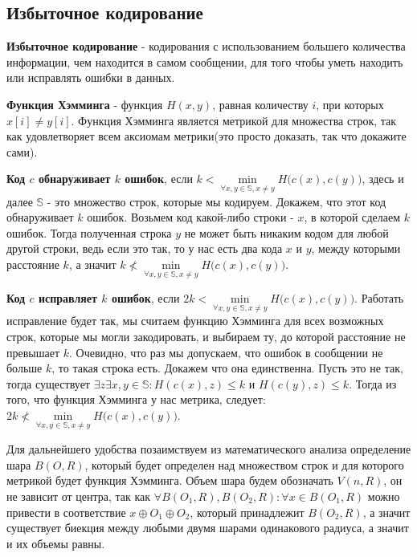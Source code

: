 
\subsection{Избыточное кодирование}
\textbf{Избыточное кодирование} - кодирования с использованием большего количества информации, чем находится в самом сообщении, для того чтобы уметь находить или исправлять ошибки в данных. 

\textbf{Функция Хэмминга} - функция $H(x,y)$, равная количеству $i$, при которых $x[i]\neq y[i]$. Функция Хэмминга является метрикой для множества строк, так как удовлетворяет всем аксиомам метрики(это просто доказать, так что докажите сами). 

\textbf{Код $c$ обнаруживает $k$ ошибок}, если $k < \min\limits_{\forall x,y \in \mathbb{S}, x\neq y} H\biggl(c(x),c(y)\biggr)$, здесь и далее $\mathbb{S}$ - это множество строк, которые мы кодируем. Докажем, что этот код обнаруживает $k$ ошибок. Возьмем код какой-либо строки - $x$, в которой сделаем $k$ ошибок. Тогда полученная строка $y$ не может быть никаким кодом для любой другой строки, ведь если это так, то у нас есть два кода $x$ и $y$, между которыми расстояние $k$, а значит $k \nless \min\limits_{\forall x,y \in \mathbb{S}, x\neq y} H\biggl(c(x),c(y)\biggr)$.

\textbf{Код $c$ исправляет $k$ ошибок}, если $2k < \min\limits_{\forall x,y \in \mathbb{S}, x\neq y} H\biggl(c(x),c(y)\biggr)$. Работать исправление будет так, мы считаем функцию Хэмминга для всех возможных строк, которые мы могли закодировать, и выбираем ту, до которой расстояние не превышает $k$. Очевидно, что раз мы допускаем, что ошибок в сообщении не больше $k$, то такая строка есть. Докажем что она единственна. Пусть это не так, тогда существует $\exists z\exists x,y\in\mathbb{S}: H(c(x), z) \leq k$ и $H(c(y), z) \leq k$. Тогда из того, что функция Хэмминга у нас метрика, следует: $2k \nless \min\limits_{\forall x,y \in \mathbb{S}, x\neq y} H\biggl(c(x),c(y)\biggr)$.

Для дальнейшего удобства позаимствуем из математического анализа определение шара $B(O, R)$, который будет определен над множеством строк и для которого метрикой будет функция Хэмминга. Объем шара будем обозначать $V(n, R)$, он не зависит от центра, так как $\forall B(O_1,R), B(O_2, R) : \forall x\in B(O_1, R)$ можно привести в соответствие $x \oplus O_1 \oplus O_2$, который принадлежит $B(O_2, R)$, а значит существует биекция между любыми двумя шарами одинакового радиуса, а значит и их объемы равны. 

